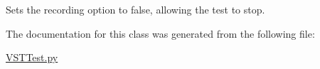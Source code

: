 Sets the recording option to false, allowing the test to stop. 



The documentation for this class was generated from the following file\+:\begin{DoxyCompactItemize}
\item 
\hyperlink{_v_s_t_test_8py}{V\+S\+T\+Test.\+py}\end{DoxyCompactItemize}
